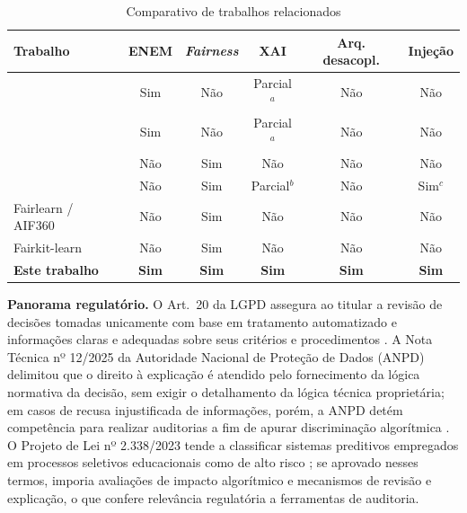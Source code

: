 \begin{table}[htbp]
\centering
\caption{Comparativo de trabalhos relacionados}
\label{tab:comparativo}
\small
\begin{tabular}{lccccc}
\toprule
\textbf{Trabalho} & \textbf{ENEM} & \textbf{\textit{Fairness}} & \textbf{XAI} & \textbf{Arq. desacopl.} & \textbf{Injeção} \\
\midrule
\cite{luz2025uso} & Sim & Não & Parcial$^{a}$ & Não & Não \\
\cite{souza2025desigualdades} & Sim & Não & Parcial$^{a}$ & Não & Não \\
\cite{aoudi2025fairness} & Não & Sim & Não & Não & Não \\
\cite{alu2026auditing} & Não & Sim & Parcial$^{b}$ & Não & Sim$^{c}$ \\
Fairlearn / AIF360 & Não & Sim & Não & Não & Não \\
Fairkit-learn & Não & Sim & Não & Não & Não \\
\textbf{Este trabalho} & \textbf{Sim} & \textbf{Sim} & \textbf{Sim} & \textbf{Sim} & \textbf{Sim} \\
\bottomrule
\end{tabular}
\end{table}

\textbf{Panorama regulatório.} O Art.~20 da LGPD assegura ao titular a revisão de decisões tomadas unicamente com base em tratamento automatizado e informações claras e adequadas sobre seus critérios e procedimentos \cite{brasil2018lgpd}. A Nota Técnica nº 12/2025 da Autoridade Nacional de Proteção de Dados (ANPD) delimitou que o direito à explicação é atendido pelo fornecimento da lógica normativa da decisão, sem exigir o detalhamento da lógica técnica proprietária; em casos de recusa injustificada de informações, porém, a ANPD detém competência para realizar auditorias a fim de apurar discriminação algorítmica \cite{anpd2025nota12}. O Projeto de Lei nº 2.338/2023 tende a classificar sistemas preditivos empregados em processos seletivos educacionais como de alto risco \cite{brasil2023pl2338}; se aprovado nesses termos, imporia avaliações de impacto algorítmico e mecanismos de revisão e explicação, o que confere relevância regulatória a ferramentas de auditoria.
